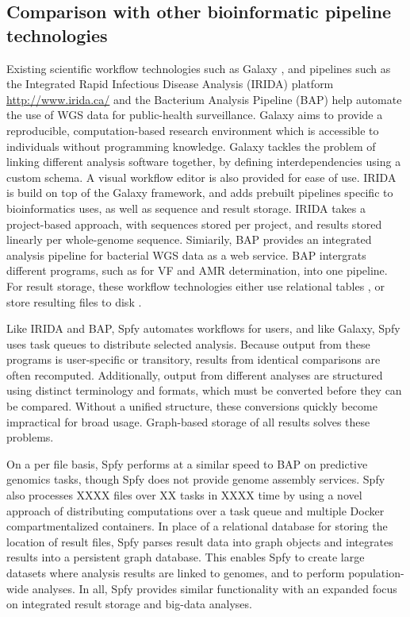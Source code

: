 \documentclass{article}
\begin{document}
\subsection{Comparison with other bioinformatic pipeline technologies}

Existing scientific workflow technologies such as Galaxy \cite{goecks2010galaxy}, and pipelines such as the Integrated Rapid Infectious Disease Analysis (IRIDA) platform \url{http://www.irida.ca/} and the Bacterium Analysis Pipeline (BAP) \cite{thomsen2016bacterial} help automate the use of WGS data for public-health surveillance.
Galaxy aims to provide a reproducible, computation-based research environment which is accessible to individuals without programming knowledge. Galaxy tackles the problem of linking different analysis software together, by defining interdependencies using a custom schema. A visual workflow editor is also provided for ease of use.
IRIDA is build on top of the Galaxy framework, and adds prebuilt pipelines specific to bioinformatics uses, as well as sequence and result storage. IRIDA takes a project-based approach, with sequences stored per project, and results stored linearly per whole-genome sequence. Simiarily, BAP provides an integrated analysis pipeline for bacterial WGS data as a web service.
BAP intergrats different programs, such as for VF and AMR determination, into one pipeline. For result storage, these workflow technologies either use relational tables \cite{goecks2010galaxy}, or store resulting files to disk \cite{thomsen2016bacterial}.

Like IRIDA and BAP, Spfy automates workflows for users, and like Galaxy, Spfy uses task queues to distribute selected analysis.
Because output from these programs is user-specific or transitory, results from identical comparisons are often recomputed. Additionally, output from different analyses are structured using distinct terminology and formats, which must be converted before they can be compared. Without a unified structure, these conversions quickly become impractical for broad usage. Graph-based storage of all results solves these problems.

On a per file basis, Spfy performs at a similar speed to BAP on predictive genomics tasks, though Spfy does not provide genome assembly services.
Spfy also processes XXXX files over XX tasks in XXXX time by using a novel approach of distributing computations over a task queue and multiple Docker compartmentalized containers.
In place of a relational database for storing the location of result files, Spfy parses result data into graph objects and integrates results into a persistent graph database.
This enables Spfy to create large datasets where analysis results are linked to genomes, and to perform population-wide analyses. In all, Spfy provides similar functionality with an expanded focus on integrated result storage and big-data analyses.
\end{document}
